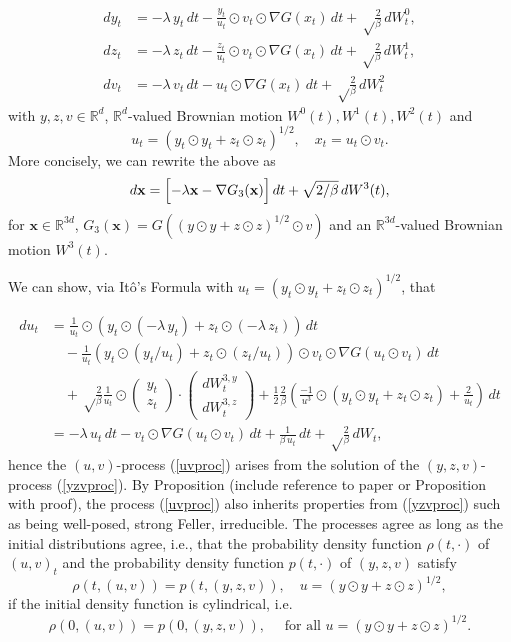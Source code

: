 \documentclass{article}
\renewcommand{\vec}[1]{{\mathbf{#1}}}
\begin{document}
\begin{equation} 
\begin{split} 
dy_t&=-\lambda\,   y_t\,dt - \frac{y_t}{u_t} \odot v_t\odot \nabla G(x_t)\,dt
 +\sqrt\frac{2}{\beta}\,dW^0_t,\\
dz_t&=-\lambda\,   z_t\,dt - \frac{z_t}{u_t} \odot v_t\odot \nabla G(x_t)\,dt
 +\sqrt\frac{2}{\beta}\,dW^1_t,\\
dv_t&=-\lambda\,   v_t\,dt - u_t\odot \nabla G(x_t)\,dt
 +\sqrt\frac{2}{\beta}\,dW^2_t
\label{yzvproc}
\end{split}
\end{equation}
with $y,z,v \in \mathbb{R}^d$, $\mathbb{R}^{d}$-valued Brownian motion $W^0(t), W^1(t), W^2(t)$ and
\[u_t = (y_t \odot y_t + z_t \odot z_t)^{1/2}, \quad x_t = u_t \odot v_t.\]
More concisely, we can rewrite the above as 
\begin{equation}  
 \begin{aligned}
 d\vec x= \Bigl[-\lambda \vec x - \nabla G_{3}(\vec x)\Bigr]\,dt +\sqrt{2/\beta}\, dW^3(t),
  \end{aligned}\label{cyl}
\end{equation}
for $\vec x \in \mathbb{R}^{3d}$, $G_{3}(\vec x)= G( (y\odot y + z\odot z)^{1/2} \odot v)$ and an $\mathbb{R}^{3d}$-valued Brownian motion $W^3(t)$. 

We can show, via It\^{o}'s Formula with $u_t = (y_t \odot y_t + z_t \odot z_t)^{1/2}$, that 

$$
\begin{aligned}
  du_t&=\frac{1}{u_t}\odot(y_t\odot(-\lambda\,y_t)+z_t\odot(-\lambda\, z_t))\,dt\\&\quad
  -\frac{1}{u_t}(y_t\odot (y_t/u_t)+z_t\odot(z_t/u_t))\odot v_t\odot \nabla G(u_t\odot v_t)\,dt \\&\quad+\sqrt\frac{2}{\beta} \frac 1{u_t} \odot\begin{pmatrix}y_t\\z_t\end{pmatrix}
  \cdot\begin{pmatrix} dW_t^{3,y}\\ dW_t^{3,z}\end{pmatrix}
  + \frac 12 \frac{2}{\beta} \left(\frac{-1}{u^3}\odot(y_t\odot y_t+z_t\odot z_t)+\frac{2}{u_t}\right)\,dt\\
  &=-\lambda\,   u_t\,dt - v_t\odot \nabla G(u_t\odot v_t)\,dt
 +\frac{1}{\beta \,u_t}\,dt+ \sqrt\frac{2}{\beta}\,dW_t,
\end{aligned}
$$
hence the $(u,v)$-process (\ref{uvproc}) arises from the solution of the $(y,z,v)$-process (\ref{yzvproc}). By Proposition (include reference to paper or Proposition with proof), the process (\ref{uvproc}) also inherits properties from (\ref{yzvproc}) such as being well-posed, strong Feller, irreducible. The processes agree as long as the initial distributions agree, i.e., that the probability density function $\rho(t,\cdot)$ of $(u,v)_t$ and the probability density function $p(t,\cdot)$ of $(y,z,v)$ satisfy
\[\rho(t,(u,v)) = p(t,(y,z,v)), \quad u = (y \odot y + z \odot z)^{1/2},\]
if the initial density function is cylindrical, i.e.
\[\rho(0,(u,v)) = p(0,(y,z,v)), \quad \text{ for all } u = (y \odot y + z \odot z)^{1/2}.\]
\end{document}

